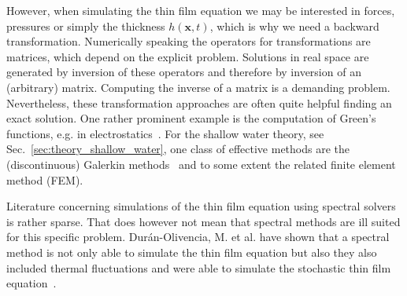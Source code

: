 However, when simulating the thin film equation we may be interested in forces, pressures or simply the thickness $h(\mathbf{x},t)$, which is why we need a backward transformation.
Numerically speaking the operators for transformations are matrices, which depend on the explicit problem.
Solutions in real space are generated by inversion of these operators and therefore by inversion of an (arbitrary) matrix.
Computing the inverse of a matrix is a demanding problem. 
Nevertheless, these transformation approaches are often quite helpful finding an exact solution.
One rather prominent example is the computation of Green's functions, e.g. in electrostatics~\cite{greenEssayApplicationMathematical1889}.
For the shallow water theory, see Sec.~\ref{sec:theory_shallow_water}, one class of effective methods are the (discontinuous) Galerkin methods~\cite{ernTheoryPracticeFinite2004} and to some extent the related finite element method (FEM).

Literature concerning simulations of the thin film equation using spectral solvers is rather sparse. 
That does however not mean that spectral methods are ill suited for this specific problem.
Dur{\'a}n-Olivencia, M. et al. have shown that a spectral method is not only able to simulate the thin film equation but also they also included thermal fluctuations and were able to simulate the stochastic thin film equation~\cite{duran-olivenciaInstabilityRuptureFluctuations2019}.

